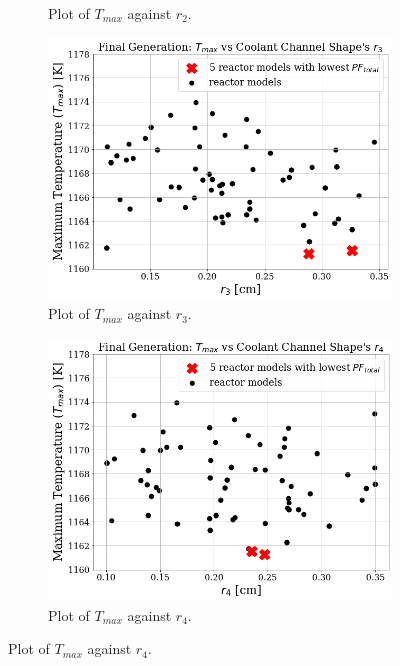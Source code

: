 \begin{frame}
\begin{figure}
\begin{subfigure}{0.3\textwidth}
            \caption{Plot of $T_{max}$ against $r_2$.}
            \label{fig:a-1e-r2} 
        \end{subfigure}
        \begin{subfigure}{0.3\textwidth}
            \includegraphics[width=\linewidth]{../docs/figures/a-1e-r3.png}
            \caption{Plot of $T_{max}$ against $r_3$.}
            \label{fig:a-1e-r3} 
        \end{subfigure}
        \begin{subfigure}{0.3\textwidth}
            \includegraphics[width=\linewidth]{../docs/figures/a-1e-r4.png}
            \caption{Plot of $T_{max}$ against $r_4$.}
            \label{fig:a-1e-r4} 

\end{subfigure}
\end{figure}
\end{frame}
